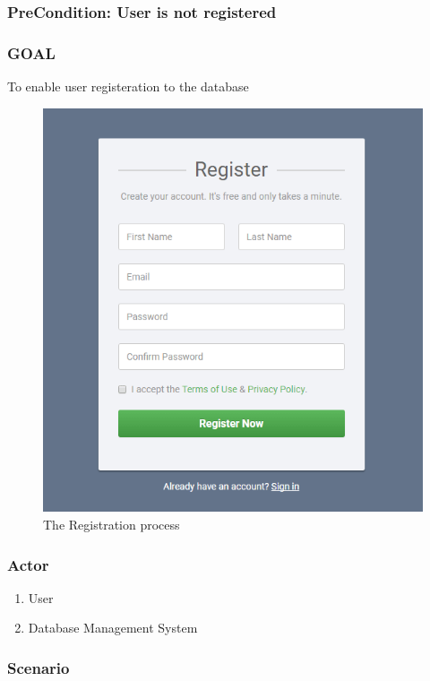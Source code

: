 \documentclass{article}
\begin{document}
\subsubsection{PreCondition: User is not registered}
\subsubsection{GOAL}
To enable user registeration to the database

\begin{figure}[h!]
\centering
\includegraphics[scale=0.5]{register}
\caption{The Registration process}
\label{fig:register}
\end{figure}

\subsubsection{Actor}

\begin{enumerate}
    \item  User
    \item  Database Management System

\end{enumerate}
\subsubsection{Scenario}
\end{document}
